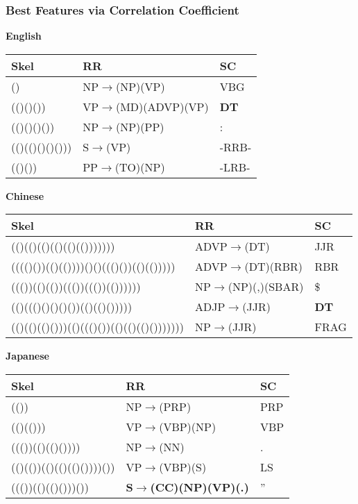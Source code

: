 \begin{frame}
    \frametitle{Best Features via Correlation Coefficient}
    {\tiny
    \begin{center}
    \textbf{English}

    \begin{tabular}{|l|l|l|}
        \hline
        \textbf{Skel} & \textbf{RR }& \textbf{SC }\\
        \hline
        ()             &  NP$\rightarrow$(NP)(VP)      &  VBG  \\
        (()()())       &  VP$\rightarrow$(MD)(ADVP)(VP)&  \textbf{DT}   \\
        (()()()())     &  NP$\rightarrow$(NP)(PP)      &  :    \\
        (()(()()()())) &  S$\rightarrow$(VP)           &  -RRB-\\
        (()())         &  PP$\rightarrow$(TO)(NP)      &  -LRB-\\
        \hline
    \end{tabular}

    \vspace{.1in}
    \textbf{Chinese}

    \begin{tabular}{|l|l|l|}
        \hline
        \textbf{Skel} & \textbf{RR }& \textbf{SC }\\
        \hline
        (()(()(()(()(()(())))))) & ADVP$\rightarrow$(DT)       &  JJR \\
         (((()())(()(())))()()((()())(()(())))) & ADVP$\rightarrow$(DT)(RBR)  &  RBR \\
        ((())(()(())((())((())(())))))  & NP$\rightarrow$(NP)(,)(SBAR)& \$   \\
        (()((()()()()())(()(()())))) &  ADJP$\rightarrow$(JJR)      &
        \textbf{DT}  \\
        (()(()(()()))(()((()())(()(()(()()))))))   & NP$\rightarrow$(JJR)        &  FRAG\\
        \hline
    \end{tabular}

    \vspace{.1in}
    \textbf{Japanese}

    \begin{tabular}{|l|l|l|}
        \hline
        \textbf{Skel} & \textbf{RR }& \textbf{SC }\\
        \hline
         (())                      & NP$\rightarrow$(PRP)         &  PRP\\
          (()(()))                 & VP$\rightarrow$(VBP)(NP)     &  VBP\\
         ((())(()(()())))          & NP$\rightarrow$(NN)          &  .  \\
          (()(())(()(()(()())))()) & VP$\rightarrow$(VBP)(S)      &  LS \\
        ((())(()(()()))())       & \textbf{S$\rightarrow$(CC)(NP)(VP)(.)}&  '' \\
        \hline
    \end{tabular}
    \end{center}}


\end{frame}
